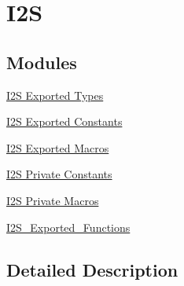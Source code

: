 \hypertarget{group___i2_s}{}\section{I2S}
\label{group___i2_s}
\subsection*{Modules}
\begin{DoxyCompactItemize}
\item 
\hyperlink{group___i2_s___exported___types}{I2\+S Exported Types}
\item 
\hyperlink{group___i2_s___exported___constants}{I2\+S Exported Constants}
\item 
\hyperlink{group___i2_s___exported__macros}{I2\+S Exported Macros}
\item 
\hyperlink{group___i2_s___private___constants}{I2\+S Private Constants}
\item 
\hyperlink{group___i2_s___private___macros}{I2\+S Private Macros}
\item 
\hyperlink{group___i2_s___exported___functions}{I2\+S\+\_\+\+Exported\+\_\+\+Functions}
\end{DoxyCompactItemize}


\subsection{Detailed Description}
